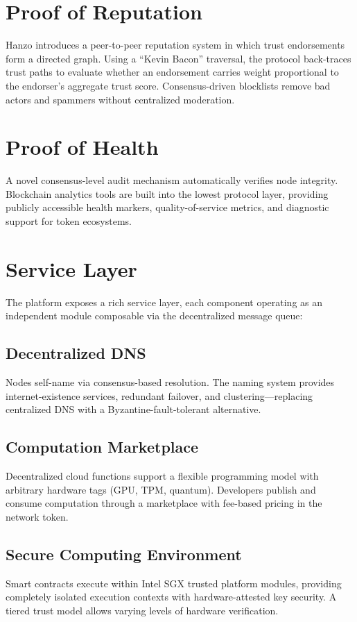 \documentclass[11pt,twocolumn]{article}
\begin{document}
\section{Proof of Reputation}
\label{sec:reputation}

Hanzo introduces a peer-to-peer reputation system in which trust endorsements
form a directed graph. Using a ``Kevin Bacon'' traversal, the protocol
back-traces trust paths to evaluate whether an endorsement carries weight
proportional to the endorser's aggregate trust score. Consensus-driven blocklists
remove bad actors and spammers without centralized moderation.

\section{Proof of Health}
\label{sec:health}

A novel consensus-level audit mechanism automatically verifies node integrity.
Blockchain analytics tools are built into the lowest protocol layer, providing
publicly accessible health markers, quality-of-service metrics, and diagnostic
support for token ecosystems.

\section{Service Layer}
\label{sec:services}

The platform exposes a rich service layer, each component operating as an
independent module composable via the decentralized message queue:

\subsection{Decentralized DNS}
Nodes self-name via consensus-based resolution. The naming system provides
internet-existence services, redundant failover, and clustering---replacing
centralized DNS with a Byzantine-fault-tolerant alternative.

\subsection{Computation Marketplace}
Decentralized cloud functions support a flexible programming model with arbitrary
hardware tags (GPU, TPM, quantum). Developers publish and consume computation
through a marketplace with fee-based pricing in the network token.

\subsection{Secure Computing Environment}
Smart contracts execute within Intel SGX trusted platform modules, providing
completely isolated execution contexts with hardware-attested key security. A
tiered trust model allows varying levels of hardware verification.
\end{document}

